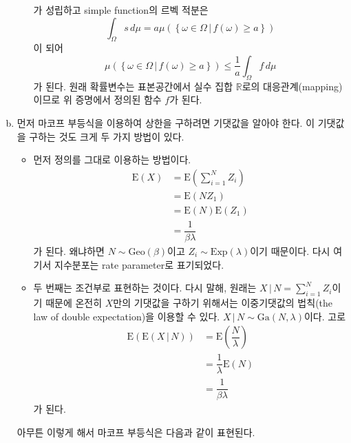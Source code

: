 \documentclass[answers]{exam}
\begin{document}
\begin{questions}
\begin{solution}
\begin{enumerate}[(a)]
\begin{itemize}
          가 성립하고 simple function의 르벡 적분은
          \begin{equation}
            \int_{\Omega}s\,d\mu = a\mu\left(\left\{\omega \in \Omega\,|\, f\left(\omega\right)\geq a\right\}\right)
          \end{equation}
          이 되어
          \begin{equation}
            \mu\left(\left\{\omega \in \Omega\,|\, f\left(\omega\right)\geq a\right\}\right) \leq \dfrac{1}{a}\int_{\Omega}f\,d\mu
          \end{equation}
          가 된다. 원래 확률변수는 표본공간에서 실수 집합 $\mathbb{R}$로의 대응관계(mapping)이므로 위 증명에서 정의된 함수 $f$가 된다.
        \end{itemize}
        \item 먼저 마코프 부등식을 이용하여 상한을 구하려면 기댓값을 알아야 한다. 이 기댓값을 구하는 것도 크게 두 가지 방법이 있다.
        \begin{itemize}
          \item 먼저 정의를 그대로 이용하는 방법이다.
          \begin{align}
            \mathrm{E}\left(X\right) &= \mathrm{E}\left(\sum_{i=1}^{N}Z_{i}\right)\\
            &= \mathrm{E}\left(NZ_{1}\right)\\
            &=\mathrm{E}\left(N\right)\mathrm{E}\left(Z_{1}\right)\\
            &= \dfrac{1}{\beta\lambda}
          \end{align}
          가 된다. 왜냐하면 $N\sim \mathrm{Geo}\left(\beta\right)$이고 $Z_{i}\sim \mathrm{Exp}\left(\lambda\right)$이기 때문이다. 다시 여기서 지수분포는 rate parameter로 표기되었다. 
          \item 두 번째는 조건부로 표현하는 것이다. 다시 말해, 원래는 $X\,|\,N=\sum_{i=1}^{N}Z_{i}$이기 때문에 온전히 $X$만의 기댓값을 구하기 위해서는 이중기댓값의 법칙(the law of double expectation)을 이용할 수 있다. $X\,|\,N \sim \mathrm{Ga}\left(N,\lambda\right)$이다. 고로
          \begin{align}
            \mathrm{E}\left(\mathrm{E}\left(X\,|\,N\right)\right) &= \mathrm{E}\left(\dfrac{N}{\lambda}\right)\\
            &= \dfrac{1}{\lambda}\mathrm{E}\left(N\right)\\
            &= \dfrac{1}{\beta\lambda}
          \end{align}
          가 된다.
        \end{itemize}
        아무튼 이렇게 해서 마코프 부등식은 다음과 같이 표현된다.

\end{enumerate}
\end{solution}
\end{questions}
\end{document}
